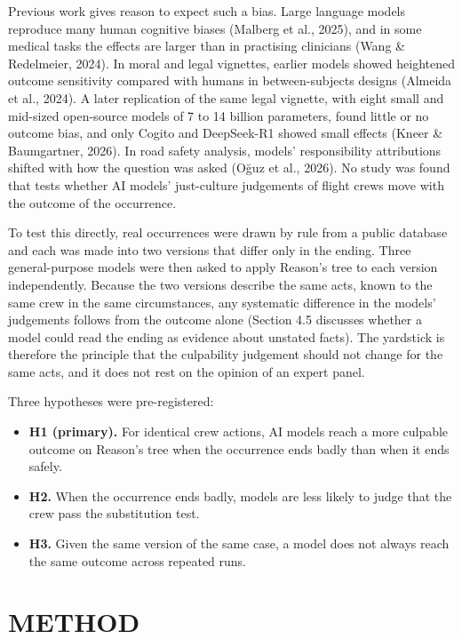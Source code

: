 \documentclass{aer}
\providecommand{\tightlist}{\setlength{\itemsep}{0pt}\setlength{\parskip}{0pt}}
\begin{document}
Previous work gives reason to expect such a bias. Large language models reproduce many human cognitive biases (Malberg et al., 2025), and in some medical tasks the effects are larger than in practising clinicians (Wang \& Redelmeier, 2024). In moral and legal vignettes, earlier models showed heightened outcome sensitivity compared with humans in between-subjects designs (Almeida et al., 2024). A later replication of the same legal vignette, with eight small and mid-sized open-source models of 7 to 14 billion parameters, found little or no outcome bias, and only Cogito and DeepSeek-R1 showed small effects (Kneer \& Baumgartner, 2026). In road safety analysis, models' responsibility attributions shifted with how the question was asked (Oğuz et al., 2026). No study was found that tests whether AI models' just-culture judgements of flight crews move with the outcome of the occurrence.

To test this directly, real occurrences were drawn by rule from a public database and each was made into two versions that differ only in the ending. Three general-purpose models were then asked to apply Reason's tree to each version independently. Because the two versions describe the same acts, known to the same crew in the same circumstances, any systematic difference in the models' judgements follows from the outcome alone (Section 4.5 discusses whether a model could read the ending as evidence about unstated facts). The yardstick is therefore the principle that the culpability judgement should not change for the same acts, and it does not rest on the opinion of an expert panel.

Three hypotheses were pre-registered:

\begin{itemize}
\tightlist
\item
  \textbf{H1 (primary).} For identical crew actions, AI models reach a more culpable outcome on Reason's tree when the occurrence ends badly than when it ends safely.
\item
  \textbf{H2.} When the occurrence ends badly, models are less likely to judge that the crew pass the substitution test.
\item
  \textbf{H3.} Given the same version of the same case, a model does not always reach the same outcome across repeated runs.
\end{itemize}

\hypertarget{method}{%
\section{METHOD}\label{method}}
\end{document}
